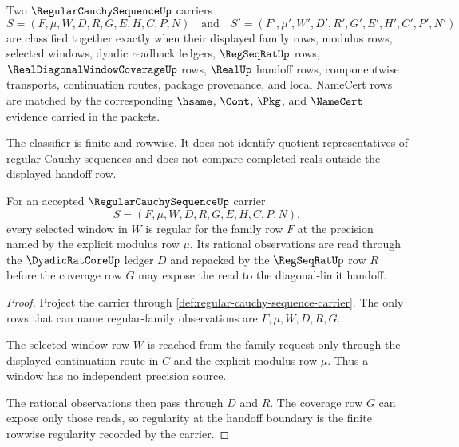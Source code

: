 \begin{definition}
\label{def:regular-cauchy-sequence-classifier}
Two $\RegularCauchySequenceUp$ carriers
$$
S=(F,\mu,W,D,R,G,E,H,C,P,N)
\quad\text{and}\quad
S'=(F',\mu',W',D',R',G',E',H',C',P',N')
$$
are classified together exactly when their displayed family rows, modulus rows, selected windows, dyadic readback ledgers, $\RegSeqRatUp$ rows, $\RealDiagonalWindowCoverageUp$ rows, $\RealUp$ handoff rows, componentwise transports, continuation routes, package provenance, and local NameCert rows are matched by the corresponding $\hsame$, $\Cont$, $\Pkg$, and $\NameCert$ evidence carried in the packets.

The classifier is finite and rowwise. It does not identify quotient representatives of regular Cauchy sequences and does not compare completed reals outside the displayed handoff row.
\end{definition}

\begin{theorem}
\label{thm:regular-cauchy-sequence-window-regularity}
For an accepted $\RegularCauchySequenceUp$ carrier
$$
S=(F,\mu,W,D,R,G,E,H,C,P,N),
$$
every selected window in $W$ is regular for the family row $F$ at the precision named by the explicit modulus row $\mu$. Its rational observations are read through the $\DyadicRatCoreUp$ ledger $D$ and repacked by the $\RegSeqRatUp$ row $R$ before the coverage row $G$ may expose the read to the diagonal-limit handoff.
\end{theorem}
\begin{proof}
Project the carrier through \autoref{def:regular-cauchy-sequence-carrier}. The only rows that can name regular-family observations are $F,\mu,W,D,R,G$.

The selected-window row $W$ is reached from the family request only through the displayed continuation route in $C$ and the explicit modulus row $\mu$. Thus a window has no independent precision source.

The rational observations then pass through $D$ and $R$. The coverage row $G$ can expose only those reads, so regularity at the handoff boundary is the finite rowwise regularity recorded by the carrier.
\end{proof}

